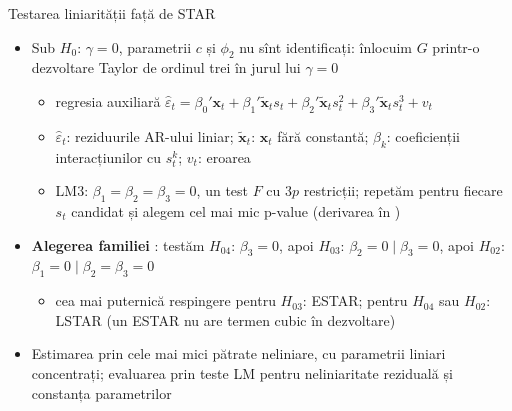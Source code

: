 \begin{frame}{Testarea liniarității față de STAR}
\itemsize{\small}
\begin{itemize}
    \item Sub $H_0$: $\gamma = 0$, parametrii $c$ și $\phi_2$ nu sînt identificați: înlocuim $G$ printr-o dezvoltare Taylor de ordinul trei în jurul lui $\gamma = 0$ 
    \begin{itemize}
        \item regresia auxiliară $\hat\varepsilon_t = \beta_0'\mathbf x_t + \beta_1'\tilde{\mathbf x}_t s_t + \beta_2'\tilde{\mathbf x}_t s_t^2 + \beta_3'\tilde{\mathbf x}_t s_t^3 + v_t$
        \item $\hat\varepsilon_t$: reziduurile AR-ului liniar; $\tilde{\mathbf x}_t$: $\mathbf x_t$ fără constantă; $\beta_k$: coeficienții interacțiunilor cu $s_t^k$; $v_t$: eroarea
        \item LM3: $\beta_1 = \beta_2 = \beta_3 = 0$, un test $F$ cu $3p$ restricții; repetăm pentru fiecare $s_t$ candidat și alegem cel mai mic p-value (derivarea în )
    \end{itemize}
    \item \textbf{Alegerea familiei} : testăm $H_{04}$: $\beta_3 = 0$, apoi $H_{03}$: $\beta_2 = 0 \mid \beta_3 = 0$, apoi $H_{02}$: $\beta_1 = 0 \mid \beta_2 = \beta_3 = 0$
    \begin{itemize}
        \item cea mai puternică respingere pentru $H_{03}$: ESTAR; pentru $H_{04}$ sau $H_{02}$: LSTAR (un ESTAR nu are termen cubic în dezvoltare)
    \end{itemize}
    \item Estimarea prin cele mai mici pătrate neliniare, cu parametrii liniari concentrați; evaluarea prin teste LM pentru neliniaritate reziduală și constanța parametrilor 
\end{itemize}
\end{frame}

